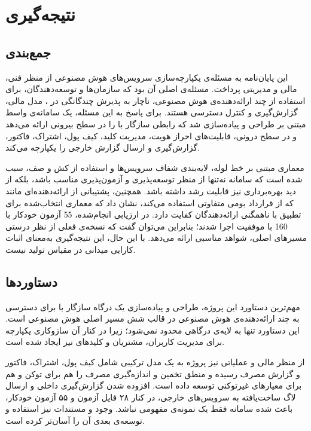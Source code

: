 \chapter{نتیجه‌گیری}
\label{ch:conclusion}

\section{جمع‌بندی}

این پایان‌نامه به مسئله‌ی یکپارچه‌سازی سرویس‌های هوش مصنوعی از منظر
فنی، مالی و مدیریتی پرداخت. مسئله‌ی اصلی آن بود که سازمان‌ها و
توسعه‌دهندگان، برای استفاده از چند ارائه‌دهنده‌ی هوش مصنوعی، ناچار به
پذیرش چندگانگی در ، مدل مالی، گزارش‌گیری و کنترل دسترسی هستند.
برای پاسخ به این مسئله، یک سامانه‌ی واسط مبتنی بر  طراحی و
پیاده‌سازی شد که رابطی سازگار با  را در سطح بیرونی ارائه می‌دهد
و در سطح درونی، قابلیت‌های احراز هویت، مدیریت کلید، کیف پول، اشتراک،
فاکتور، گزارش‌گیری و ارسال گزارش خارجی را یکپارچه می‌کند.

معماری مبتنی بر خط لوله، لایه‌بندی شفاف سرویس‌ها و استفاده از کش و صف،
سبب شده است که سامانه نه‌تنها از منظر توسعه‌پذیری و آزمون‌پذیری مناسب
باشد، بلکه از دید بهره‌برداری نیز قابلیت رشد داشته باشد. همچنین، پشتیبانی
از ارائه‌دهنده‌ای مانند  که از قرارداد بومی متفاوتی استفاده
می‌کند، نشان داد که معماری انتخاب‌شده برای تطبیق با ناهمگنی ارائه‌دهندگان
کفایت دارد. در ارزیابی انجام‌شده، 55 آزمون خودکار با 160
 با موفقیت اجرا شدند؛ بنابراین می‌توان گفت که نسخه‌ی فعلی
از نظر درستی مسیرهای اصلی، شواهد مناسبی ارائه می‌دهد. با این حال، این
نتیجه‌گیری به‌معنای اثبات کارایی میدانی در مقیاس تولید نیست.

\section{دستاوردها}

مهم‌ترین دستاورد این پروژه، طراحی و پیاده‌سازی یک درگاه سازگار با
 برای دسترسی به چند ارائه‌دهنده‌ی هوش مصنوعی در قالب شش مسیر
اصلی هوش مصنوعی است. این دستاورد تنها به لایه‌ی درگاهی محدود نمی‌شود؛
زیرا در کنار آن سازوکاری یکپارچه برای مدیریت کاربران، مشتریان و کلیدهای
 نیز ایجاد شده است.

از منظر مالی و عملیاتی نیز پروژه به یک مدل ترکیبی شامل کیف پول، اشتراک،
فاکتور و گزارش مصرف رسیده و منطق تخمین و اندازه‌گیری مصرف را هم برای
توکن و هم برای معیارهای غیرتوکنی توسعه داده است. افزوده شدن گزارش‌گیری
داخلی و ارسال لاگ ساخت‌یافته به سرویس‌های خارجی، در کنار ۲۸ فایل آزمون و
۵۵ آزمون خودکار، باعث شده سامانه فقط یک نمونه‌ی مفهومی نباشد. وجود
 و مستندات  نیز استفاده و توسعه‌ی بعدی آن را
آسان‌تر کرده است.

